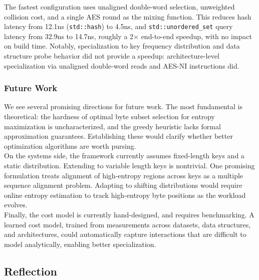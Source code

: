 \noindent
The fastest configuration uses unaligned double-word selection, unweighted collision cost, and a single AES round as the mixing function. This reduces hash 
latency from 12.1ns (\texttt{std::hash}) to 4.5ns, and \texttt{std::unordered\_set} query latency from 32.9ns to 14.7ns, roughly a 2$\times$ end-to-end speedup, 
with no impact on build time. Notably, specialization to key frequency distribution and data structure probe behavior did not provide a speedup: 
architecture-level specialization via unaligned double-word reads and AES-NI instructions did. 

\subsubsection{Future Work}

We see several promising directions for future work. The most fundamental is theoretical: the hardness of optimal byte subset selection for entropy 
maximization is uncharacterized, and the greedy heuristic lacks formal approximation guarantees. Establishing these would clarify whether better optimization 
algorithms are worth pursing. \\

\noindent
On the systems side, the framework currently assumes fixed-length keys and a static distribution. Extending to variable length keys is nontrivial. One promising
formulation treats alignment of high-entropy regions across keys as a multiple sequence alignment problem. Adapting to shifting distributions would require 
online entropy estimation to track high-entropy byte positions as the workload evolves. \\

\noindent
Finally, the cost model is currently hand-designed, and requires benchmarking. A learned cost model, trained from measurements across datasets, data structures,
and architectures, could automatically capture interactions that are difficult to model analytically, enabling better specialization. 



\subsection{Reflection}

